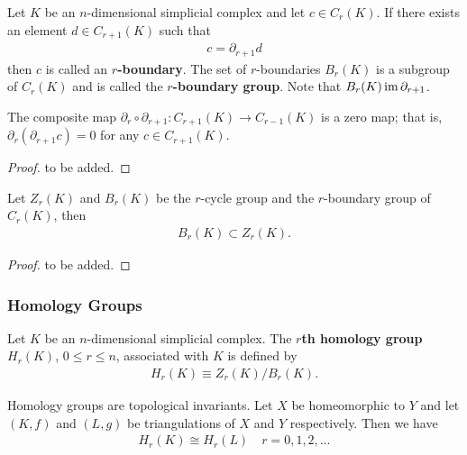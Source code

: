 \documentclass[10pt]{article}
\begin{document}
\begin{definition}
    Let $K$ be an $n$-dimensional simplicial complex and let $c\in C_r(K)$.
    If there exists an element $d\in C_{r+1}(K)$ such that
    \begin{align}
        c=\partial_{r+1}d
    \end{align}
    then $c$ is called an \textbf{$r$-boundary}.
    The set of $r$-boundaries $B_r(K)$ is a subgroup of $C_r(K)$ and is called the \textbf{$r$-boundary group}.
    Note that $B_r(K)\operatorname{im} \partial_{r+1}$.
\end{definition}

\begin{lemma}
    The composite map $\partial_r\circ \partial_{r+1}:C_{r+1}(K)\to C_{r-1}(K)$ is a zero map;
    that is, $\partial_r(\partial_{r+1}c)=0$ for any $c\in C_{r+1}(K)$.
\end{lemma}
\begin{proof}
    to be added.
\end{proof}

\begin{theorem}
    Let $Z_r(K)$ and $B_r(K)$ be the $r$-cycle group and the $r$-boundary group of $C_r(K)$, then
    \begin{align}
        B_r(K)\subset Z_r(K).
    \end{align}
\end{theorem}
\begin{proof}
    to be added.
\end{proof}

\subsubsection{Homology Groups}
\begin{definition}
    Let $K$ be an $n$-dimensional simplicial complex.
    The \textbf{$r$th homology group} $H_r(K)$, $0\leq r\leq n$, associated with $K$ is defined by
    \begin{align}
        H_r(K)\equiv Z_r(K)/B_r(K).
    \end{align}
\end{definition}

\begin{theorem}
    Homology groups are topological invariants.
    Let $X$ be homeomorphic to $Y$ and let $(K,f)$ and $(L,g)$ be triangulations of $X$ and $Y$ respectively.
    Then we have
    \begin{align}
        H_r(K)\cong H_r(L)\quad r=0,1,2,\dots
    \end{align}
\end{theorem}
\end{document}
